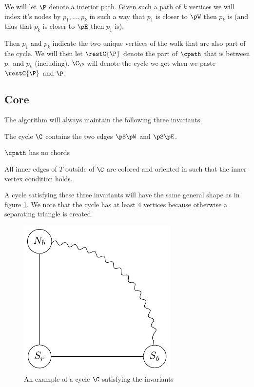 We will let $\P$ denote a interior path. Given such a path of $k$ vertices we will index it's nodes by $p_1, \ldots, p_k$ in such a way that $p_1$ is closer to $\pW$ then $p_k$ is (and thus that $p_k$ is closer to $\pE$ then $p_1$ is).

Then $p_1$ and $p_k$ indicate the two unique vertices of the walk that are also part of the cycle. We will then let $\restC{\P}$ denote the part of $\cpath$ that is between $p_1$ and $p_k$ (including). $\C_\P$ will denote the cycle we get when we paste $\restC{\P}$ and $\P$.



\subsection{Core}
\label{ss:core}

The algorithm will always maintain the following three invariants

\begin{invariants}
  \itemsep=-4pt

\item \label{i:SWandSE} The cycle $\C$ contains the two edges $\pS \pW$ and $\pS \pE$.
\item \label{i:noChords} $\cpath$ has no chords
\item \label{i:last} All inner edges of $T$ outside of $\C$ are colored and oriented in such that the inner vertex condition holds. %
\end{invariants}

A cycle satisfying these three invariants will have the same general shape as in figure \ref{fig:invCycle}. We note that the cycle has at least $4$ vertices because otherwise a separating triangle is created.

\begin{figure}[h!]
\centering
\includegraphics{algo/img/invCycle}

\caption{An example of a cycle $\C$ satisfying the invariants
    \label{fig:invCycle}}
\end{figure}

